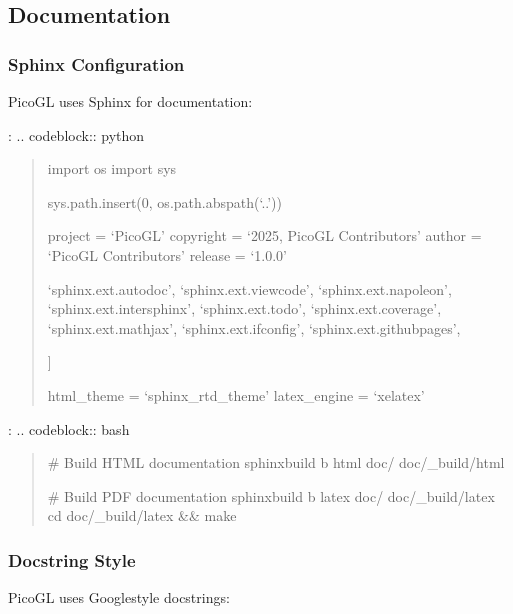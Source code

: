 \documentclass[a4paper,10pt,english,openany,oneside]{sphinxmanual}
\begin{document}
\subsection{Documentation}
\label{\detokenize{development:documentation}}

\subsubsection{Sphinx Configuration}
\label{\detokenize{development:sphinx-configuration}}
\sphinxAtStartPar
PicoGL uses Sphinx for documentation:

\sphinxAtStartPar
{}:
.. code\sphinxhyphen{}block:: python
\begin{quote}

\sphinxAtStartPar
import os
import sys

\sphinxAtStartPar
sys.path.insert(0, os.path.abspath(‘..’))

\sphinxAtStartPar
project = ‘PicoGL’
copyright = ‘2025, PicoGL Contributors’
author = ‘PicoGL Contributors’
release = ‘1.0.0’
\begin{description}
\sphinxlineitem{extensions = {[}}
\sphinxAtStartPar
‘sphinx.ext.autodoc’,
‘sphinx.ext.viewcode’,
‘sphinx.ext.napoleon’,
‘sphinx.ext.intersphinx’,
‘sphinx.ext.todo’,
‘sphinx.ext.coverage’,
‘sphinx.ext.mathjax’,
‘sphinx.ext.ifconfig’,
‘sphinx.ext.githubpages’,

\end{description}

\sphinxAtStartPar
{]}

\sphinxAtStartPar
html\_theme = ‘sphinx\_rtd\_theme’
latex\_engine = ‘xelatex’
\end{quote}

\sphinxAtStartPar
{}:
.. code\sphinxhyphen{}block:: bash
\begin{quote}

\sphinxAtStartPar
\# Build HTML documentation
sphinx\sphinxhyphen{}build \sphinxhyphen{}b html doc/ doc/\_build/html

\sphinxAtStartPar
\# Build PDF documentation
sphinx\sphinxhyphen{}build \sphinxhyphen{}b latex doc/ doc/\_build/latex
cd doc/\_build/latex \&\& make
\end{quote}


\subsubsection{Docstring Style}
\label{\detokenize{development:docstring-style}}
\sphinxAtStartPar
PicoGL uses Google\sphinxhyphen{}style docstrings:
\end{document}
